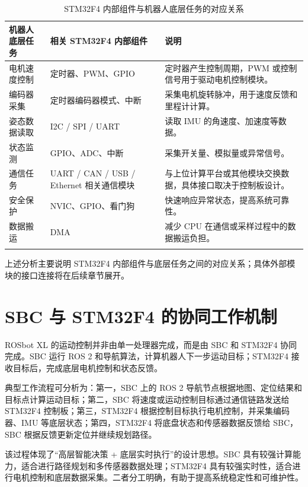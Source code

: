 \documentclass[UTF8,a4paper,12pt]{ctexrep}
\newcommand{\tabrowline}{\specialrule{0.25pt}{0pt}{0pt}}
\begin{document}
\begin{table}[H]
  \centering
  \caption{STM32F4 内部组件与机器人底层任务的对应关系}
  \label{tab:stm32-task-map}
  \small
  \begin{tabularx}{\textwidth}{L{3.0cm}L{4.2cm}Y}
    \toprule
    \textbf{机器人底层任务} & \textbf{相关 STM32F4 内部组件} & \textbf{说明} \\
    \midrule
    电机速度控制 & 定时器、PWM、GPIO & 定时器产生控制周期，PWM 或控制信号用于驱动电机控制模块。 \\
    \tabrowline
    编码器采集 & 定时器编码器模式、中断 & 采集电机旋转脉冲，用于速度反馈和里程计计算。 \\
    \tabrowline
    姿态数据读取 & I2C / SPI / UART & 读取 IMU 的角速度、加速度等数据。 \\
    \tabrowline
    状态监测 & GPIO、ADC、中断 & 采集开关量、模拟量或异常信号。 \\
    \tabrowline
    通信任务 & UART / CAN / USB / Ethernet 相关通信模块 & 与上位计算平台或其他模块交换数据，具体接口取决于控制板设计。 \\
    \tabrowline
    安全保护 & NVIC、GPIO、看门狗 & 快速响应异常状态，提高系统可靠性。 \\
    \tabrowline
    数据搬运 & DMA & 减少 CPU 在通信或采样过程中的数据搬运负担。 \\
    \bottomrule
  \end{tabularx}
\end{table}

上述分析主要说明 STM32F4 内部组件与底层任务之间的对应关系；具体外部模块的接口连接将在后续章节展开。

\section{SBC 与 STM32F4 的协同工作机制}

ROSbot XL 的运动控制并非由单一处理器完成，而是由 SBC 和 STM32F4 协同完成。SBC 运行 ROS 2 和导航算法，计算机器人下一步运动目标；STM32F4 接收目标后，完成底层电机控制和状态反馈。

典型工作流程可分析为：第一，SBC 上的 ROS 2 导航节点根据地图、定位结果和目标点计算运动目标；第二，SBC 将速度或运动控制目标通过通信链路发送给 STM32F4 控制板；第三，STM32F4 根据控制目标执行电机控制，并采集编码器、IMU 等底层状态；第四，STM32F4 将底盘状态和传感器数据反馈给 SBC，SBC 根据反馈更新定位并继续规划路径。

该过程体现了“高层智能决策 + 底层实时执行”的设计思想。SBC 具有较强计算能力，适合进行路径规划和多传感器数据处理；STM32F4 具有较强实时性，适合进行电机控制和底层数据采集。二者分工明确，有助于提高系统稳定性和可维护性。
\end{document}
